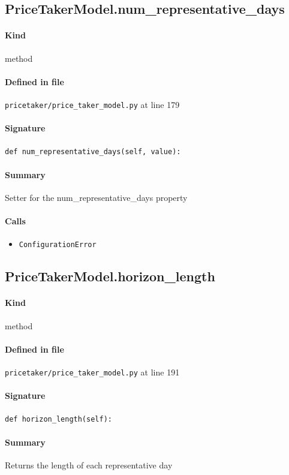 \documentclass[11pt]{report}
\begin{document}
\subsection{PriceTakerModel.num\_representative\_days}
\label{def:pricetaker-price_taker_model.py:PriceTakerModel.num_representative_days:L179}
\paragraph{Kind} method
\paragraph{Defined in file} \texttt{pricetaker/price\_taker\_model.py} at line 179
\paragraph{Signature} \texttt{def num\_representative\_days(self, value):}
\paragraph{Summary} Setter for the num\_representative\_days property
\paragraph{Calls}
\begin{itemize}[leftmargin=*]
  \item \texttt{ConfigurationError}
\end{itemize}
\subsection{PriceTakerModel.horizon\_length}
\label{def:pricetaker-price_taker_model.py:PriceTakerModel.horizon_length:L191}
\paragraph{Kind} method
\paragraph{Defined in file} \texttt{pricetaker/price\_taker\_model.py} at line 191
\paragraph{Signature} \texttt{def horizon\_length(self):}
\paragraph{Summary} Returns the length of each representative day
\end{document}
